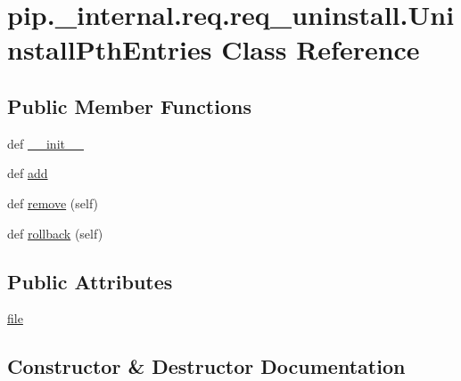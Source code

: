 \hypertarget{classpip_1_1__internal_1_1req_1_1req__uninstall_1_1UninstallPthEntries}{}\section{pip.\+\_\+internal.\+req.\+req\+\_\+uninstall.\+Uninstall\+Pth\+Entries Class Reference}
\label{classpip_1_1__internal_1_1req_1_1req__uninstall_1_1UninstallPthEntries}
\subsection*{Public Member Functions}
\begin{DoxyCompactItemize}
\item 
def \hyperlink{classpip_1_1__internal_1_1req_1_1req__uninstall_1_1UninstallPthEntries_a7a88a33d66ff6d76608c9b6363582a00}{\+\_\+\+\_\+init\+\_\+\+\_\+}
\item 
def \hyperlink{classpip_1_1__internal_1_1req_1_1req__uninstall_1_1UninstallPthEntries_ada04639c4b9aa4cbfe7e41e3e3d6815d}{add}
\item 
def \hyperlink{classpip_1_1__internal_1_1req_1_1req__uninstall_1_1UninstallPthEntries_ac489927e566e08ffdc3e777f4cdd015d}{remove} (self)
\item 
def \hyperlink{classpip_1_1__internal_1_1req_1_1req__uninstall_1_1UninstallPthEntries_a8d5cc10db26c6b0fc134f0fb3e1bbcb8}{rollback} (self)
\end{DoxyCompactItemize}
\subsection*{Public Attributes}
\begin{DoxyCompactItemize}
\item 
\hyperlink{classpip_1_1__internal_1_1req_1_1req__uninstall_1_1UninstallPthEntries_a4bb84280549b06194d1a6275b6b51802}{file}
\end{DoxyCompactItemize}


\subsection{Constructor \& Destructor Documentation}
\mbox{\label{classpip_1_1__internal_1_1req_1_1req__uninstall_1_1UninstallPthEntries_a7a88a33d66ff6d76608c9b6363582a00}} 
